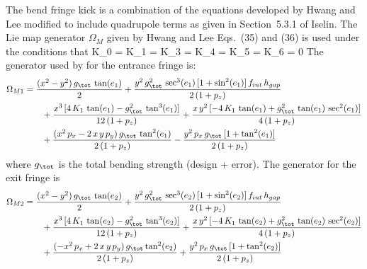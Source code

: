 The bend fringe kick is a combination of the equations developed by Hwang and Lee\cite{b:hwang}
modified to include quadrupole terms as given in Section~5.3.1 of Iselin\cite{b:madphysics}.
The Lie map generator $\Omega_M$ given by Hwang and Lee Eqs.~(35) and (36) is used under
the conditions that
\Begineq
  K_0 = K_1 = K_3 = K_4 = K_5 = K_6 = 0
\Endeq
The generator used by \bmad for the entrance fringe is:
\begin{align}
  \Omega_{M1} &= \frac{(x^2 - y^2) \, g_\tot \, \tan (e_1)}{2} 
  + \frac{y^2 \, g_\tot^2 \, \sec^3 (e_1) \, [1 + \sin^2 (e_1)] \, f_{int} \,  h_{gap}}{2 \, (1 + p_z)} \CRNO
  & \qquad + \frac{x^3 \, [4 \, K_1 \, \tan (e_1) - g_\tot^2 \, \tan^3 (e_1)]}{12 \, (1 + p_z)}
  + \frac{x \, y^2 \, [-4 \, K_1 \, \tan (e_1) + g_\tot^2 \, \tan (e_1) \, \sec^2 (e_1)]}{4 \, (1 + p_z)} \\
  &\qquad + \frac{(x^2 \, p_x - 2 \, x \, y \, p_y) \, g_\tot \, \tan^2 (e_1)}{2 \, (1 + p_z)}
  - \frac{y^2 \, p_x \, g_\tot \, [1 + \tan^2 (e_1)]}{2 \, (1 + p_z)} \nonumber
\end{align}
where $g_\tot$ is the total bending strength (design + error).
The generator for the exit fringe is
\begin{align}
  \Omega_{M2} &= \frac{(x^2 - y^2) \, g_\tot \, \tan (e_2)}{2} 
  + \frac{y^2 \, g_\tot^2 \, \sec^3 (e_2) \, [1 + \sin^2 (e_2)] \, f_{int} \,  h_{gap}}{2 \, (1 + p_z)} \CRNO
  &\qquad + \frac{x^3 \, [4 \, K_1 \, \tan (e_2) - g_\tot^2 \, \tan^3 (e_2)]}{12 \, (1 + p_z)}
  + \frac{x \, y^2 \, [-4 \, K_1 \, \tan (e_2) + g_\tot^2 \, \tan (e_2) \, \sec^2 (e_2)]}{4 \, (1+p_z)} \\
  &\qquad + \frac{(-x^2 \, p_x + 2 \, x \, y \, p_y) \, g_\tot \tan^2 (e_2)}{2 \, (1 + p_z)}
  + \frac{y^2 \, p_x \, g_\tot \, [1 + \tan^2 (e_2)]}{2 \, (1 + p_z)} \nonumber
\end{align}

